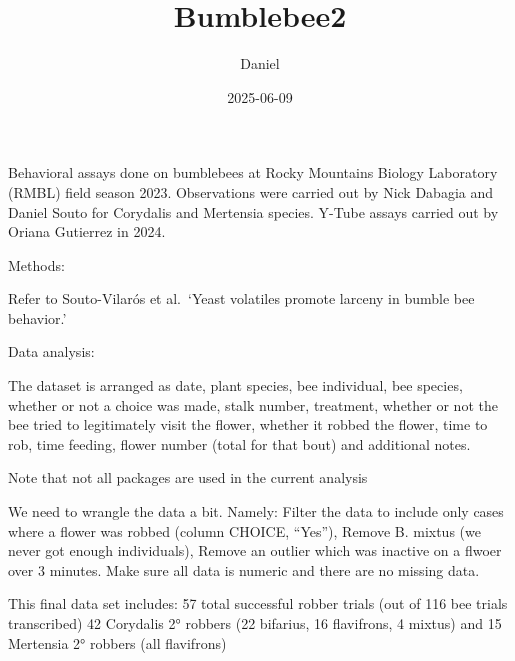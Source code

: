 \documentclass[
]{article}
\title{Bumblebee2}
\author{Daniel}
\date{2025-06-09}
\begin{document}
\maketitle

Behavioral assays done on bumblebees at Rocky Mountains Biology
Laboratory (RMBL) field season 2023. Observations were carried out by
Nick Dabagia and Daniel Souto for Corydalis and Mertensia species.
Y-Tube assays carried out by Oriana Gutierrez in 2024.

Methods:

Refer to Souto-Vilarós et al.~`Yeast volatiles promote larceny in bumble
bee behavior.'

Data analysis:

The dataset is arranged as date, plant species, bee individual, bee
species, whether or not a choice was made, stalk number, treatment,
whether or not the bee tried to legitimately visit the flower, whether
it robbed the flower, time to rob, time feeding, flower number (total
for that bout) and additional notes.

Note that not all packages are used in the current analysis

We need to wrangle the data a bit. Namely: Filter the data to include
only cases where a flower was robbed (column CHOICE, ``Yes''), Remove B.
mixtus (we never got enough individuals), Remove an outlier which was
inactive on a flwoer over 3 minutes. Make sure all data is numeric and
there are no missing data.

This final data set includes: 57 total successful robber trials (out of
116 bee trials transcribed) 42 Corydalis 2° robbers (22 bifarius, 16
flavifrons, 4 mixtus) and 15 Mertensia 2° robbers (all flavifrons)
\end{document}
